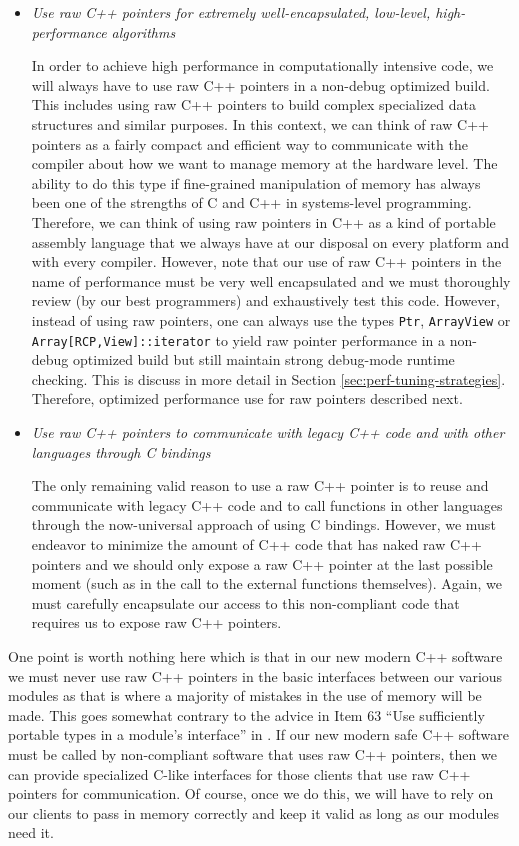 \documentclass[pdf,ps2pdf,11pt]{SANDreport}
\begin{document}
\begin{itemize}

{}\item{}\textit{Use raw C++ pointers for extremely well-encapsulated,
low-level, high-performance algorithms}

In order to achieve high performance in computationally intensive
code, we will always have to use raw C++ pointers in a non-debug
optimized build.  This includes using raw C++ pointers to build
complex specialized data structures and similar purposes.  In this
context, we can think of raw C++ pointers as a fairly compact and
efficient way to communicate with the compiler about how we want to
manage memory at the hardware level.  The ability to do this type if
fine-grained manipulation of memory has always been one of the
strengths of C and C++ in systems-level programming.  Therefore, we
can think of using raw pointers in C++ as a kind of portable assembly
language that we always have at our disposal on every platform and
with every compiler.  However, note that our use of raw C++ pointers
in the name of performance must be very well encapsulated and we must
thoroughly review (by our best programmers) and exhaustively test this
code.  However, instead of using raw pointers, one can always use the
types {}\texttt{Ptr}, {}\texttt{ArrayView} or
{}\texttt{Array[RCP,View]::iterator} to yield raw pointer performance
in a non-debug optimized build but still maintain strong debug-mode
runtime checking.  This is discuss in more detail in Section
{}\ref{sec:perf-tuning-strategies}.  Therefore, optimized performance
use for raw pointers described next.

{}\item{}\textit{Use raw C++ pointers to communicate with legacy C++
code and with other languages through C bindings}

The only remaining valid reason to use a raw C++ pointer is to reuse
and communicate with legacy C++ code and to call functions in other
languages through the now-universal approach of using C bindings.
However, we must endeavor to minimize the amount of C++ code that has
naked raw C++ pointers and we should only expose a raw C++ pointer at
the last possible moment (such as in the call to the external
functions themselves).  Again, we must carefully encapsulate our
access to this non-compliant code that requires us to expose raw C++
pointers.

\end{itemize}

One point is worth nothing here which is that in our new modern C++
software we must never use raw C++ pointers in the basic interfaces
between our various modules as that is where a majority of mistakes in
the use of memory will be made.  This goes somewhat contrary to the
advice in Item 63 ``Use sufficiently portable types in a module's
interface'' in {}\cite{C++CodingStandards05}.  If our new modern safe
C++ software must be called by non-compliant software that uses raw
C++ pointers, then we can provide specialized C-like interfaces for
those clients that use raw C++ pointers for communication.  Of course,
once we do this, we will have to rely on our clients to pass in memory
correctly and keep it valid as long as our modules need it.
\end{document}
